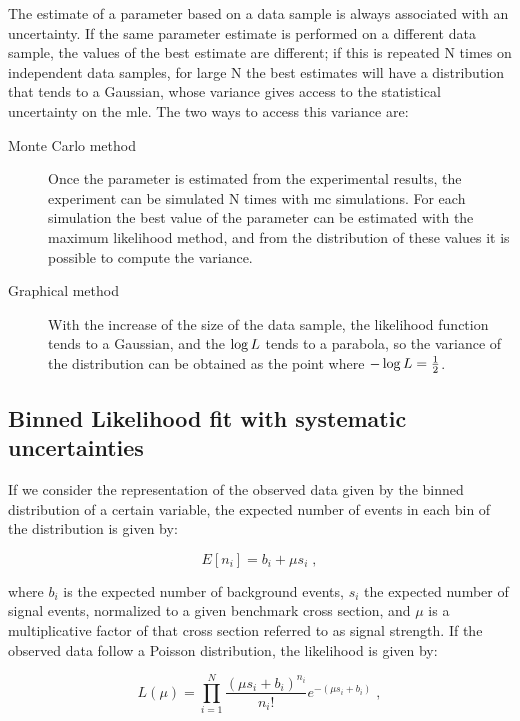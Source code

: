 The estimate of a parameter based on a data sample is always associated with an uncertainty.
If the same parameter estimate is performed on a different data sample, the values of the best estimate are different;
if this is repeated N times on independent data samples, for large N the best estimates will have a distribution that tends to a Gaussian, 
whose variance gives access to the statistical uncertainty on the \gls{mle}. The two ways to access this variance are:

\begin{description}
\item[Monte Carlo method] Once the parameter is estimated from the experimental results, the experiment can be simulated N times with \gls{mc}  simulations. For each simulation the best value of the parameter can be estimated with the maximum likelihood method, and from the distribution of these values it is possible to compute the variance.

\item[Graphical method] With the increase of the size of the data sample, the likelihood function tends to a Gaussian, and the $\log{L}$ tends to a parabola, so the variance of the distribution can be obtained as the point where $-\log{L} = \frac{1}{2}$.

\end{description}


\subsection{Binned Likelihood fit with systematic uncertainties}

If we consider the representation of the observed data given by the binned distribution of a certain variable, the expected number of events in each bin of the distribution is given by:

\begin{equation}
\label{eq:stat:exp}
E[n_i] = b_i + \mu s_i  \; ,
\end{equation}

\noindent where $b_i$ is the expected number of background events, $s_i$ the expected number of signal events, normalized to a given benchmark cross section, and $\mu$ is a multiplicative factor of that cross section referred to as signal strength.
If the observed data follow a Poisson distribution, the likelihood is given by:

\begin{equation}
\label{eq:stat:lik_no_sys}
L(\mu) =
\prod_{i=1}^N \frac{ (\mu s_{i} +
b_{i} )^{n_{i}} }{ n_{i}! }
e^{- (\mu s_{i} + b_{i}) } \; ,
\end{equation}


